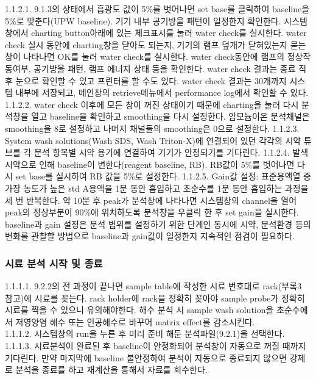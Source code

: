 \documentclass[
]{book}
\begin{document}
1.1.2.1. 9.1.3의 상태에서 흡광도 값이 5\%를 벗어나면 set base를 클릭하여 baseline을 5\%로 맞춘다(UPW baseline). 기기 내부 공기방울 패턴이 일정한지 확인한다. 시스템 창에서 charting button아래에 있는 체크표시를 눌러 water check를 실시한다. water check 실시 동안에 charting창을 닫아도 되는지, 기기의 램프 덮개가 닫혀있는지 묻는 창이 나타나면 OK를 눌러 water check를 실시한다. water check동안에 램프의 정상작동여부, 공기방울 패턴, 램프 에너지 상태 등을 확인한다. water check 결과는 종료 직후 눈으로 확인할 수 있고 프린터를 할 수도 있다. water check 결과는 30개까지 시스템 내부에 저장되고, 메인창의 retrieve메뉴에서 performance log에서 확인할 수 있다.
1.1.2.2. water check 이후에 모든 창이 꺼진 상태이기 때문에 charting을 눌러 다시 분석창을 열고 baseline을 확인하고 smoothing을 다시 설정한다. 암모늄이온 분석채널은 smoothing을 8로 설정하고 나머지 채널들의 smoothing은 0으로 설정한다.
1.1.2.3. System wash solutions(Wash SDS, Wash Triton-X)에 연결되어 있던 각각의 시약 튜브를 각 분석 항목별 시약 용기에 연결하여 기기가 안정되기를 기다린다.
1.1.2.4. 발색시약으로 인해 baseline이 변한다(reagent baseline, RB). RB값이 5\%를 벗어나면 다시 set base를 실시하여 RB 값을 5\%로 설정한다.
1.1.2.5. Gain값 설정: 표준용액열 중 가장 농도가 높은 std A용액을 1분 동안 흡입하고 초순수를 1분 동안 흡입하는 과정을 세 번 반복한다. 약 10분 후 peak가 분석창에 나타나면 시스템창의 channel을 열어 peak의 정상부분이 90\%에 위치하도록 분석창을 우클릭 한 후 set gain을 실시한다. baseline과 gain 설정은 분석 범위를 설정하기 위한 단계인 동시에 시약, 분석환경 등의 변화를 관찰할 방법으로 baseline과 gain값이 일정한지 지속적인 점검이 필요하다.

\hypertarget{uxc2dcuxb8cc-uxbd84uxc11d-uxc2dcuxc791-uxbc0f-uxc885uxb8cc}{%
\subsubsection{시료 분석 시작 및 종료}\label{uxc2dcuxb8cc-uxbd84uxc11d-uxc2dcuxc791-uxbc0f-uxc885uxb8cc}}

1.1.1.1. 9.2.2의 전 과정이 끝나면 sample table에 작성한 시료 번호대로 rack(부록3 참고)에 시료를 꽂는다. rack holder에 rack을 정확히 꽂아야 sample probe가 정확히 시료를 찍을 수 있으니 유의해야한다. 해수 분석 시 sample wash solution을 초순수에서 저영양염 해수 또는 인공해수로 바꾸어 matrix effect를 감소시킨다.\\
1.1.1.2. 시스템창의 run을 누른 후 미리 준비 해둔 분석파일(9.2.1)을 선택한다.
1.1.1.3. 시료분석이 완료된 후 baseline이 안정화되어 분석창이 자동으로 꺼질 때까지 기다린다. 만약 마지막에 baseline 불안정하여 분석이 자동으로 종료되지 않으면 강제로 분석을 종료를 하고 재계산을 통해서 자료를 회수한다.
\end{document}
